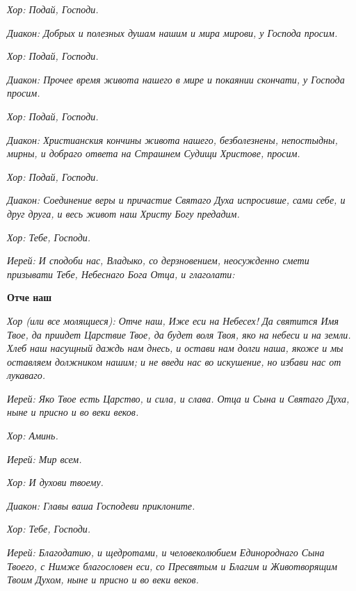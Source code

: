 \itshape Хор:\normalfont{} Подай, Господи.


\itshape Диакон:\normalfont{} Добрых и полезных душам нашим и мира мирови, у Господа просим.


\itshape Хор:\normalfont{} Подай, Господи.


\itshape Диакон:\normalfont{} Прочее время живота нашего в мире и покаянии скончати, у Господа просим.


\itshape Хор:\normalfont{} Подай, Господи.


\itshape Диакон:\normalfont{} Христианския кончины живота нашего, безболезнены, непостыдны, мирны, и добраго ответа на Страшнем Судищи Христове, просим.


\itshape Хор:\normalfont{} Подай, Господи.


\itshape Диакон:\normalfont{} Соединение веры и причастие Святаго Духа испросивше, сами себе, и друг друга, и весь живот наш Христу Богу предадим.


\itshape Хор:\normalfont{} Тебе, Господи.


\itshape Иерей:\normalfont{} И сподоби нас, Владыко, со дерзновением, неосужденно смети призывати Тебе, Небеснаго Бога Отца, и глаголати:





\bfseries  Отче наш\normalfont{}


\itshape Хор (или все молящиеся):\normalfont{} Отче наш, Иже еси на Небесех! Да святится Имя Твое, да приидет Царствие Твое, да будет воля Твоя, яко на небеси и на земли. Хлеб наш насущный даждь нам днесь, и остави нам долги наша, якоже и мы оставляем должником нашим; и не введи нас во искушение, но избави нас от лукаваго.


\itshape Иерей:\normalfont{} Яко Твое есть Царство, и сила, и слава. Отца и Сына и Святаго Духа, ныне и присно и во веки веков.


\itshape Хор:\normalfont{} Аминь.


\itshape Иерей:\normalfont{} Мир всем.


\itshape Хор:\normalfont{} И духови твоему.


\itshape Диакон:\normalfont{} Главы ваша Господеви приклоните.


\itshape Хор:\normalfont{} Тебе, Господи.


\itshape Иерей:\normalfont{} Благодатию, и щедротами, и человеколюбием Единороднаго Сына Твоего, с Нимже благословен еси, со Пресвятым и Благим и Животворящим Твоим Духом, ныне и присно и во веки веков.


